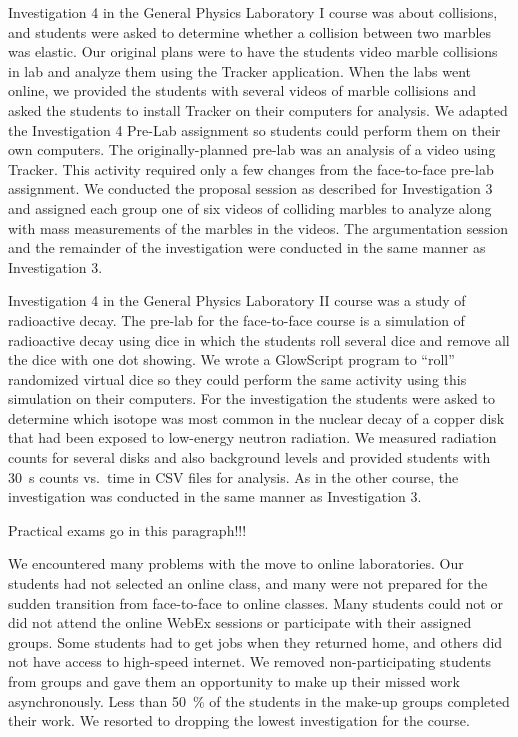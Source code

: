 \documentclass[aip, numerical, preprint]{revtex4-2}
\begin{document}
Investigation 4 in the General Physics Laboratory I course was about collisions, and students were asked to determine whether a collision between two marbles was elastic. Our original plans were to have the students video marble collisions in lab and analyze them using the Tracker application\citep{bro2009}. When the labs went online, we provided the students with several videos of marble collisions and asked the students to install Tracker on their computers for analysis.  We adapted the Investigation 4 Pre-Lab assignment so students could perform them on their own computers. The originally-planned pre-lab was an analysis of a video using Tracker. This activity required only a few changes from the face-to-face pre-lab assignment. We conducted the proposal session as described for Investigation 3 and assigned each group one of six videos of colliding marbles to analyze along with mass measurements of the marbles in the videos. The argumentation session and the remainder of the investigation were conducted in the same manner as Investigation 3.

Investigation 4 in the General Physics Laboratory II course was a study of radioactive decay. The pre-lab for the face-to-face course is a simulation of radioactive decay using dice in which the students roll several dice and remove all the dice with one dot showing. We wrote a GlowScript\citep{glowscript} program to ``roll'' randomized virtual dice so they could perform the same activity using this simulation on their computers. For the investigation the students were asked to determine which isotope was most common in the nuclear decay of a copper disk that had been exposed to low-energy neutron radiation. We measured radiation counts for several disks and also background levels and provided students with \SI{30}{s} counts vs.\ time in CSV files for analysis. As in the other course, the investigation was conducted in the same manner as Investigation 3.


Practical exams go in this paragraph!!!

We encountered many problems with the move to online laboratories. Our students had not selected an online class, and many were not prepared for the sudden transition from face-to-face to online classes. Many students could not or did not attend the online WebEx sessions or participate with their assigned groups. Some students had to get jobs when they returned home, and others did not have access to high-speed internet. We removed non-participating students from groups and gave them an opportunity to make up their missed work asynchronously. Less than \SI{50}{\percent} of the students in the make-up groups completed their work. We resorted to dropping the lowest investigation for the course.
\end{document}
